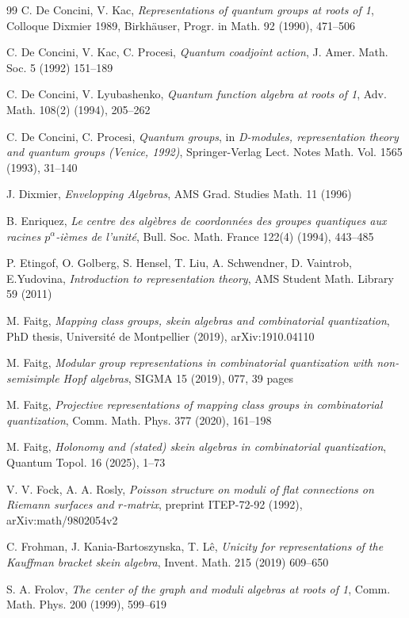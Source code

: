 \documentclass[11pt]{amsart}
\begin{document}
\begin{thebibliography}{99}
C. De Concini, V. Kac, {\it Representations of quantum groups at roots of 1}, Colloque Dixmier 1989, Birkh\"{a}user, Progr. in Math. 92 (1990), 471--506

 C. De Concini, V. Kac, C. Procesi, {\it Quantum coadjoint action}, J.  Amer. Math. Soc. 5 (1992) 151--189

 C. De Concini, V. Lyubashenko, {\it Quantum function algebra at roots of 1}, Adv. Math. 108(2) (1994), 205--262

  C. De Concini, C. Procesi, {\it Quantum groups}, in {\it D-modules, representation theory and quantum groups (Venice, 1992)}, Springer-Verlag Lect. Notes Math. Vol. 1565 (1993), 31--140

 J. Dixmier, {\it Envelopping Algebras}, AMS Grad. Studies Math. 11 (1996)

 B. Enriquez, {\it  Le centre des alg\`ebres de coordonn\'ees des groupes quantiques aux racines $p^\alpha$-i\`emes de l'unit\'e}, Bull. Soc. Math. France 122(4) (1994), 443--485 

 P. Etingof, O. Golberg, S. Hensel, T. Liu, A. Schwendner, D. Vaintrob, E.Yudovina, {\it Introduction to representation theory}, AMS Student Math. Library 59 (2011)

 M. Faitg, {\em Mapping class groups, skein algebras and combinatorial quantization}, PhD thesis, Universit\'e de Montpellier (2019),  arXiv:1910.04110

 M. Faitg, {\em Modular group representations in combinatorial quantization with non-semisimple Hopf algebras}, SIGMA 15 (2019), 077, 39 pages

 M. Faitg, {\em Projective representations of mapping class groups in combinatorial quantization}, Comm. Math. Phys. 377 (2020), 161--198

 M. Faitg, {\em Holonomy and (stated) skein algebras in combinatorial quantization}, Quantum Topol. 16 (2025), 1--73

 V. V. Fock, A. A. Rosly, {\it Poisson structure on moduli of flat connections on Riemann surfaces and $r$-matrix}, preprint ITEP-72-92 (1992), arXiv:math/9802054v2

 C. Frohman, J. Kania-Bartoszynska, T. L\^e, {\em Unicity for representations of the Kauffman bracket skein algebra}, Invent. Math. 215 (2019) 609--650 

 S. A. Frolov, {\em The center of the graph and moduli algebras at roots of 1}, Comm. Math. Phys. 200 (1999), 599--619


\end{thebibliography}
\end{document}
